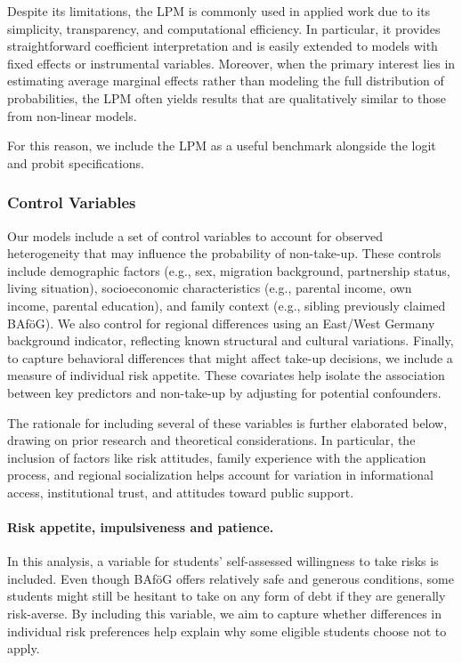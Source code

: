 Despite its limitations, the LPM is commonly used in applied work due to its simplicity, transparency, and computational efficiency. In particular, it provides straightforward coefficient interpretation and is easily extended to models with fixed effects or instrumental variables. Moreover, when the primary interest lies in estimating average marginal effects rather than modeling the full distribution of probabilities, the LPM often yields results that are qualitatively similar to those from non-linear models.

For this reason, we include the LPM as a useful benchmark alongside the logit and probit specifications.



\subsubsection{Control Variables}
Our models include a set of control variables to account for observed heterogeneity that may influence the probability of non-take-up. 
These controls include demographic factors (e.g., sex, migration background, partnership status, living situation), socioeconomic characteristics (e.g., parental income, own income, parental education), and family context (e.g., sibling previously claimed BAföG). 
We also control for regional differences using an East/West Germany background indicator, reflecting known structural and cultural variations. 
Finally, to capture behavioral differences that might affect take-up decisions, we include a measure of individual risk appetite. 
These covariates help isolate the association between key predictors and non-take-up by adjusting for potential confounders.

The rationale for including several of these variables is further elaborated below, drawing on prior research and theoretical considerations. In particular, the inclusion of factors like risk attitudes, family experience with the application process, and regional socialization helps account for variation in informational access, institutional trust, and attitudes toward public support.

\paragraph{Risk appetite, impulsiveness and patience.} In this analysis, a variable for students' self-assessed willingness to take risks is included. 
Even though BAföG offers relatively safe and generous conditions, some students might still be hesitant to take on any form of debt if they are generally risk-averse. 
By including this variable, we aim to capture whether differences in individual risk preferences help explain why some eligible students choose not to apply.

